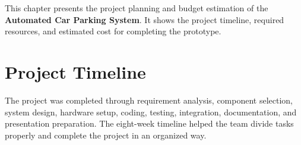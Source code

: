 
\vspace{-0.8cm}

This chapter presents the project planning and budget estimation of the \textbf{Automated Car Parking System}. It shows the project timeline, required resources, and estimated cost for completing the prototype.

\section{Project Timeline}

The project was completed through requirement analysis, component selection, system design, hardware setup, coding, testing, integration, documentation, and presentation preparation. The eight-week timeline helped the team divide tasks properly and complete the project in an organized way.

\begin{table}[H]
\centering
\small
\renewcommand{\arraystretch}{1.15}
\caption{Eight-Week Project Timeline}
\label{tab:gantt_chart}
\normalsize
\end{table}

